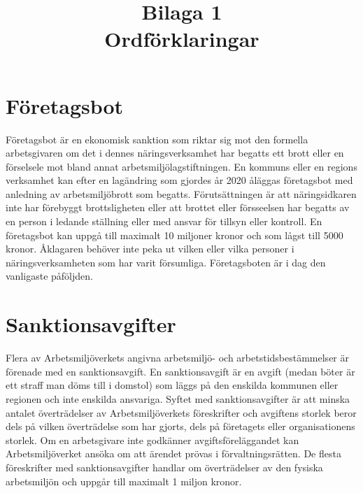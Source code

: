 \section*{Företagsbot}
Företagsbot är en ekonomisk sanktion som riktar sig mot den formella arbetsgivaren om det i dennes näringsverksamhet har begatts ett brott eller en förselsele mot bland annat arbetsmiljölagstiftningen. En kommuns eller en regions verksamhet kan efter en lagändring som gjordes år 2020 åläggas företagsbot med anledning av arbetsmiljöbrott som begatts.
Förutsättningen är att näringsidkaren inte har förebyggt brottsligheten eller att brottet eller försseelsen har begatts av en person i ledande ställning eller med ansvar för tillsyn eller kontroll. En företagsbot kan uppgå till maximalt 10 miljoner kronor och som lågst till 5000 kronor. Åklagaren behöver inte peka ut vilken eller vilka personer i näringsverksamheten som har varit försumliga. Företagsboten är i dag den vanligaste påföljden.
\section*{Sanktionsavgifter}
Flera av Arbetsmiljöverkets angivna arbetsmiljö- och arbetstidsbestämmelser är förenade med en sanktionsavgift. En sanktionsavgift är en avgift (medan böter är ett straff man döms till i domstol) som läggs på den enskilda kommunen eller regionen och inte enskilda ansvariga. Syftet med sanktionsavgifter är att minska antalet överträdelser av Arbetsmiljöverkets föreskrifter och avgiftens storlek beror dels på vilken överträdelse som har gjorts, dels på företagets eller organisationens storlek. Om en arbetsgivare inte godkänner avgiftsföreläggandet kan Arbetsmiljöverket ansöka om att ärendet prövas i förvaltningsrätten. De flesta föreskrifter med sanktionsavgifter handlar om överträdelser av den fysiska arbetsmiljön och uppgår till maximalt 1 miljon kronor.

\title{
Bilaga 1 \\ Ordförklaringar
}
